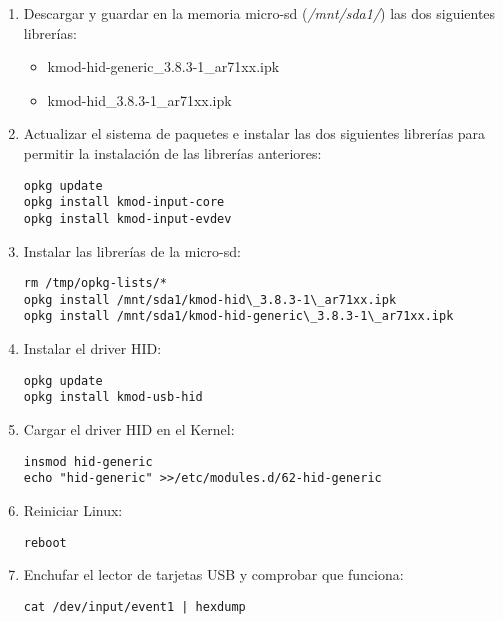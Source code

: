 \begin{enumerate}

	\item Descargar y guardar en la memoria micro-sd (\emph{/mnt/sda1/}) las dos siguientes librerías:

		\begin{itemize}
			\item kmod-hid-generic\_3.8.3-1\_ar71xx.ipk
			\item kmod-hid\_3.8.3-1\_ar71xx.ipk
		\end{itemize}

	\item Actualizar el sistema de paquetes e instalar las dos siguientes librerías para permitir la instalación de las librerías anteriores:

		\begin{lstlisting}
opkg update
opkg install kmod-input-core
opkg install kmod-input-evdev
		\end{lstlisting}

	\item Instalar las librerías de la micro-sd:

		\begin{lstlisting}
rm /tmp/opkg-lists/*
opkg install /mnt/sda1/kmod-hid\_3.8.3-1\_ar71xx.ipk
opkg install /mnt/sda1/kmod-hid-generic\_3.8.3-1\_ar71xx.ipk
		\end{lstlisting}

	\item Instalar el driver HID:

		\begin{lstlisting}
opkg update
opkg install kmod-usb-hid
		\end{lstlisting}

	\item Cargar el driver HID en el Kernel:

		\begin{lstlisting}
insmod hid-generic
echo "hid-generic" >>/etc/modules.d/62-hid-generic
		\end{lstlisting}

	\item Reiniciar Linux:

		\begin{lstlisting}
reboot
		\end{lstlisting}

	\item Enchufar el lector de tarjetas USB y comprobar que funciona:

		\begin{lstlisting}
cat /dev/input/event1 | hexdump
		\end{lstlisting}

\end{enumerate}

